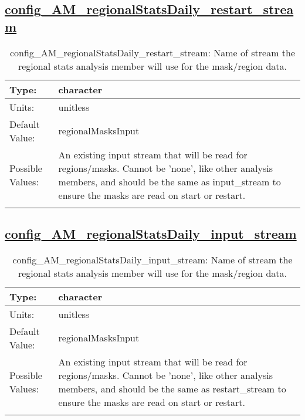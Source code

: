 \subsection[config\_AM\_regionalStatsDaily\_restart\_stream]{\hyperref[sec:nm_tab_AM_regionalStatsDaily]{config\_AM\_regionalStatsDaily\_restart\_stream}}
\label{subsec:nm_sec_config_AM_regionalStatsDaily_restart_stream}
\begin{center}
\begin{longtable}{| p{2.0in} || p{4.0in} |}
    \hline
    Type: & character \\
    \hline
    Units: & \si{unitless} \\
    \hline
    Default Value: & regionalMasksInput \\
    \hline
    Possible Values: & An existing input stream that will be read for regions/masks. Cannot be 'none', like other analysis members, and should be the same as input\_stream to ensure the masks are read on start or restart. \\
    \hline
    \caption{config\_AM\_regionalStatsDaily\_restart\_stream: Name of stream the regional stats analysis member will use for the mask/region data.}
\end{longtable}
\end{center}
\subsection[config\_AM\_regionalStatsDaily\_input\_stream]{\hyperref[sec:nm_tab_AM_regionalStatsDaily]{config\_AM\_regionalStatsDaily\_input\_stream}}
\label{subsec:nm_sec_config_AM_regionalStatsDaily_input_stream}
\begin{center}
\begin{longtable}{| p{2.0in} || p{4.0in} |}
    \hline
    Type: & character \\
    \hline
    Units: & \si{unitless} \\
    \hline
    Default Value: & regionalMasksInput \\
    \hline
    Possible Values: & An existing input stream that will be read for regions/masks. Cannot be 'none', like other analysis members, and should be the same as restart\_stream to ensure the masks are read on start or restart. \\
    \hline
    \caption{config\_AM\_regionalStatsDaily\_input\_stream: Name of stream the regional stats analysis member will use for the mask/region data.}
\end{longtable}
\end{center}
